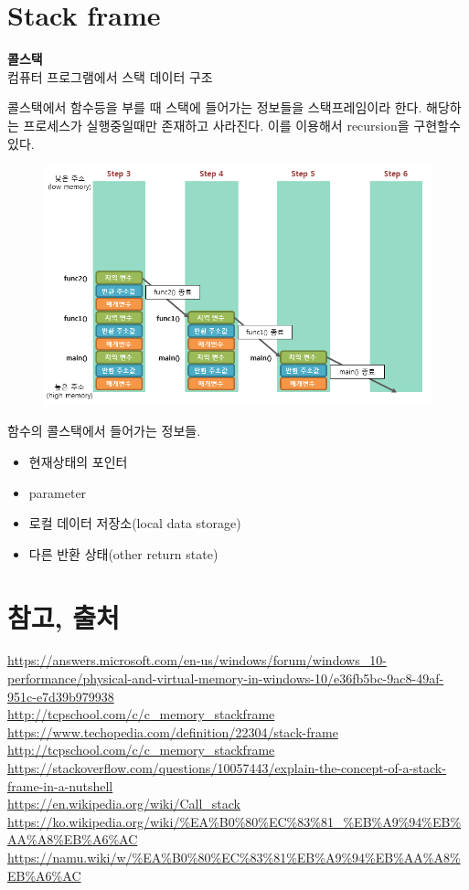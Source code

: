\documentclass{oblivoir}
\begin{document}
\section{Stack frame}
\textbf{콜스택}\\
컴퓨터 프로그램에서 스택 데이터 구조 

콜스택에서 함수등을 부를 때 스택에 들어가는 정보들을 스택프레임이라 한다.
해당하는 프로세스가 실행중일때만 존재하고 사라진다. 이를 이용해서 recursion을 구현할수있다.

\begin{figure}[h!]
    \centering
    \includegraphics[scale = 0.5]{stackframe.png}
\end{figure}
함수의 콜스택에서 들어가는 정보들.
\begin{itemize}
    \item 현재상태의 포인터
    \item parameter
    \item 로컬 데이터 저장소(local data storage)
    \item 다른 반환 상태(other return state)
\end{itemize}


\section{참고, 출처}

\url{https://answers.microsoft.com/en-us/windows/forum/windows_10-performance/physical-and-virtual-memory-in-windows-10/e36fb5bc-9ac8-49af-951c-e7d39b979938} 
\\ \url{http://tcpschool.com/c/c_memory_stackframe}
\\ \url{https://www.techopedia.com/definition/22304/stack-frame}
\\ \url{http://tcpschool.com/c/c_memory_stackframe}
\\ \url{https://stackoverflow.com/questions/10057443/explain-the-concept-of-a-stack-frame-in-a-nutshell}
\\ \url{https://en.wikipedia.org/wiki/Call_stack}
\\ \url{https://ko.wikipedia.org/wiki/%EA%B0%80%EC%83%81_%EB%A9%94%EB%AA%A8%EB%A6%AC}
\\ \url{https://namu.wiki/w/%EA%B0%80%EC%83%81%EB%A9%94%EB%AA%A8%EB%A6%AC}
\\ \url{}
\end{document}

